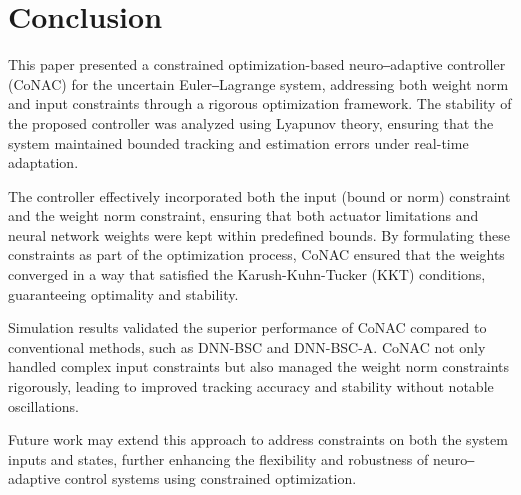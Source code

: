 \documentclass[lettersize,journal]{IEEEtran}
\begin{document}


\section{Conclusion}\label{sec:conclusion}

This paper presented a constrained optimization-based neuro‒adaptive controller (CoNAC) for the uncertain Euler‒Lagrange system, addressing both weight norm and input constraints through a rigorous optimization framework. The stability of the proposed controller was analyzed using Lyapunov theory, ensuring that the system maintained bounded tracking and estimation errors under real-time adaptation.

The controller effectively incorporated both the input (bound or norm) constraint and the weight norm constraint, ensuring that both actuator limitations and neural network weights were kept within predefined bounds. By formulating these constraints as part of the optimization process, CoNAC ensured that the weights converged in a way that satisfied the Karush-Kuhn-Tucker (KKT) conditions, guaranteeing optimality and stability.

Simulation results validated the superior performance of CoNAC compared to conventional methods, such as DNN-BSC and DNN-BSC-A. CoNAC not only handled complex input constraints but also managed the weight norm constraints rigorously, leading to improved tracking accuracy and stability without notable oscillations.

Future work may extend this approach to address constraints on both the system inputs and states, further enhancing the flexibility and robustness of neuro‒adaptive control systems using constrained optimization.



\end{document}
